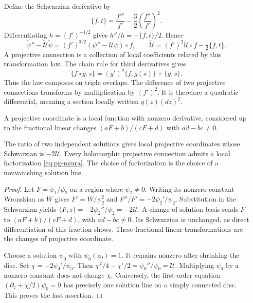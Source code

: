 Define the Schwarzian derivative by
\[
 \{f,t\}=\frac{f'''}{f'}-\frac32\left(\frac{f''}{f'}\right)^2.
\]
Differentiating $h=(f')^{-1/2}$ gives $h''/h=-\{f,t\}/2$.
Hence
\begin{equation}\label{eq:pg-projective-law}
 \widetilde\psi''-\widetilde{\mathcal U}\widetilde\psi
 =(f')^{3/2}(\psi''-\mathcal U\psi)\circ f,
 \qquad
 \widetilde{\mathcal U}=(f')^2\mathcal U\circ f-\tfrac12\{f,t\}.
\end{equation}
A projective connection is a collection of local coefficients related by this transformation law.
The chain rule for third derivatives gives
\[
 \{f\circ g,s\}=(g')^2\{f,g(s)\}+\{g,s\}.
\]
Thus the law composes on triple overlaps.
The difference of two projective connections transforms by multiplication by $(f')^2$.
It is therefore a quadratic differential, meaning a section locally written $q(z)(dz)^2$.

A projective coordinate is a local function with nonzero derivative, considered up to the fractional linear changes $(aF+b)/(cF+d)$ with $ad-bc\ne0$.

\begin{proposition}\label{prop:pg-projective-ratio}
The ratio of two independent solutions gives local projective coordinates whose Schwarzian is $-2\mathcal U$.
Every holomorphic projective connection admits a local factorization \eqref{eq:pg-miura}.
The choice of factorization is the choice of a nonvanishing solution line.
\end{proposition}
\begin{proof}
Let $F=\psi_1/\psi_2$ on a region where $\psi_2\ne0$.
Writing its nonzero constant Wronskian as $W$ gives
$F'=W/\psi_2^2$ and $F''/F'=-2\psi_2'/\psi_2$.
Substitution in the Schwarzian yields $\{F,z\}=-2\psi_2''/\psi_2=-2\mathcal U$.
A change of solution basis sends $F$ to $(aF+b)/(cF+d)$, with $ad-bc\ne0$.
Its Schwarzian is unchanged, as direct differentiation of this fraction shows.
These fractional linear transformations are the changes of projective coordinate.

Choose a solution $\psi_0$ with $\psi_0(z_0)=1$.
It remains nonzero after shrinking the disc.
Set $\chi=-2\psi_0'/\psi_0$.
Then $\chi^2/4-\chi'/2=\psi_0''/\psi_0=\mathcal U$.
Multiplying $\psi_0$ by a nonzero constant does not change $\chi$.
Conversely, the first-order equation $(\partial_z+\chi/2)\psi_0=0$
has precisely one solution line on a simply connected disc.
This proves the last assertion.
\end{proof}

